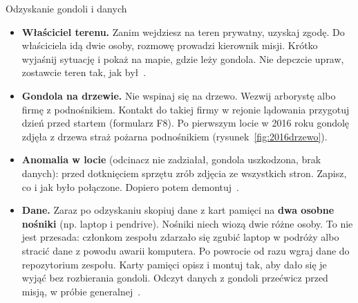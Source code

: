 \begin{sekcja}{Odzyskanie gondoli i danych}
\begin{itemize}
  \item \textbf{Właściciel terenu.} Zanim wejdziesz na teren prywatny, uzyskaj zgodę. Do właściciela idą dwie osoby, rozmowę prowadzi kierownik misji. Krótko wyjaśnij sytuację i pokaż na mapie, gdzie leży gondola. Nie depczcie upraw, zostawcie teren tak, jak był~\cite[rozdz.~2]{nasahb}.
  \item \textbf{Gondola na drzewie.} Nie wspinaj się na drzewo. Wezwij arborystę albo firmę z podnośnikiem. Kontakt do takiej firmy w rejonie lądowania przygotuj dzień przed startem (formularz F8). Po pierwszym locie w 2016 roku gondolę zdjęła z drzewa straż pożarna podnośnikiem (rysunek~\ref{fig:2016drzewo}).
  \item \textbf{Anomalia w locie} (odcinacz nie zadziałał, gondola uszkodzona, brak danych): przed dotknięciem sprzętu zrób zdjęcia ze wszystkich stron. Zapisz, co i jak było połączone. Dopiero potem demontuj~\cite[rozdz.~11]{nasahb}.
  \item \textbf{Dane.} Zaraz po odzyskaniu skopiuj dane z kart pamięci na \textbf{dwa osobne nośniki} (np. laptop i pendrive). Nośniki niech wiozą dwie różne osoby. To nie jest przesada: członkom zespołu zdarzało się zgubić laptop w podróży albo stracić dane z powodu awarii komputera. Po powrocie od razu wgraj dane do repozytorium zespołu. Karty pamięci opisz i montuj tak, aby dało się je wyjąć bez rozbierania gondoli. Odczyt danych z gondoli przećwicz przed misją, w próbie generalnej~\cite[rozdz.~12]{nasahb}.
\end{itemize}
\end{sekcja}

